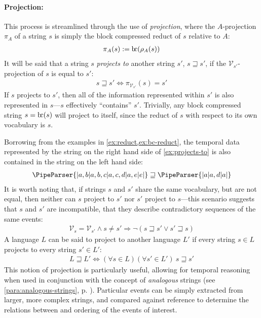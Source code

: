\documentclass[a4paper,12pt,leqno]{article}
\newcommand{\bc}{{\rm b\!c}}
\newcommand{\vph}[1]{\vphantom{#1}}
\newcommand{\ebox}[1]{\fbox{$\vph{'(),}#1$}}
\newcommand{\EventString}[1]{%
	\renewcommand*{\do}[1]{\ebox{##1}}%
	\PipeParser{#1}%
}
\begin{document}
\paragraph{Projection:}\label{para:str-op-projection}
This process is streamlined through the use of \textit{projection}, where the $A$-projection $\pi_A$ of a string $s$ is simply the block compressed reduct of $s$ relative to $A$:
\begin{align}
	\pi_A(s) := \bc(\rho_A(s))
\end{align}
It will be said that a string $s$ \textit{projects to} another string $s'$, $s \sqsupseteq s'$, if the $\mathcal{V}_{s'}$-projection of $s$ is equal to $s'$:
\begin{align}
	s \sqsupseteq s' \Longleftrightarrow  \pi_{\mathcal{V}_{s'}}(s) = s'
\end{align}
If $s$ projects to $s'$, then all of the information represented within $s'$ is also represented in $s$---$s$ effectively ``contains'' $s'$. Trivially, any block compressed string $s = \bc(s)$ will project to itself, since the reduct of $s$ with respect to its own vocabulary is $s$.

Borrowing from the examples in \cref{ex:reduct,ex:bc-reduct}, the temporal data represented by the string on the right hand side of \cref{ex:projects-to} is also contained in the string on the left hand side:
\begin{align}\label{ex:projects-to}
	\EventString{{}|a,b|a,b,c|a,c,d|a,e|e|{}} \sqsupseteq \EventString{{}|a|a,d|a|{}}
\end{align}
It is worth noting that, if strings $s$ and $s'$ share the same vocabulary, but are not equal, then neither can $s$ project to $s'$ nor $s'$ project to $s$---this scenario suggests that $s$ and $s'$ are incompatible, that they describe contradictory sequences of the same events:
\begin{align}\label{impl:cannot-project}
	\mathcal{V}_s = \mathcal{V}_{s'} \wedge s \neq s' \Longrightarrow \lnot (s \sqsupseteq s' \lor s' \sqsupseteq s)
\end{align}
A language $L$ can be said to project to another language $L'$ if every string $s \in L$ projects to every string $s' \in L'$:
\begin{align}
	L \sqsupseteq L' \Longleftrightarrow  (\forall s \in L)(\forall s' \in L')~s \sqsupseteq s'
\end{align}
This notion of projection is particularly useful, allowing for temporal reasoning when used in conjunction with the concept of \textit{analogous} strings (see \cref{para:analogous-strings}, p. \pageref{para:analogous-strings}). Particular events can be simply extracted from larger, more complex strings, and compared against reference to determine the relations between and ordering of the events of interest.
\end{document}
